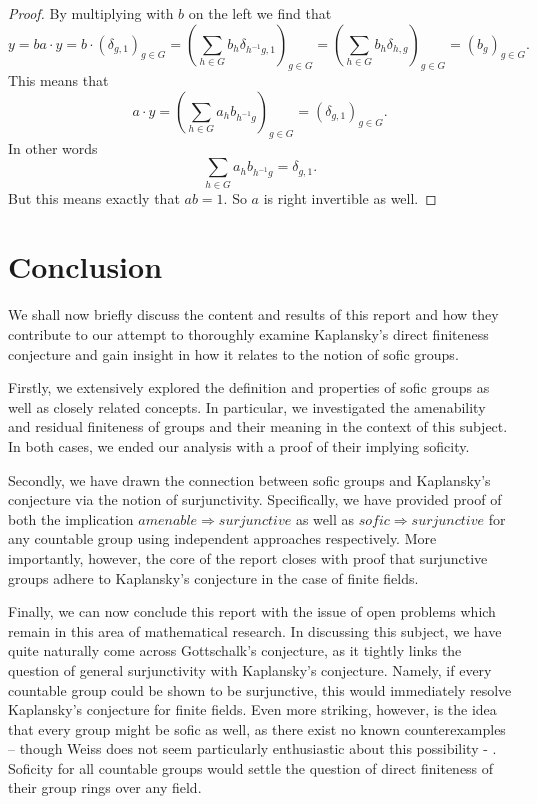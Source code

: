 \documentclass[titlepage, a4paper]{article}
\theoremstyle{theoremdd}
\theoremstyle{definitiondd}
\theoremstyle{remarkdd}
\begin{document}
\begin{proof}
		By multiplying with $b$ on the left we find that \[
			 y = ba\cdot y = b\cdot (\delta_{g, 1})_{g \in G} = \left( \sum_{h \in G} b_{h} \delta_{h^{-1}g, 1} \right)_{g \in G} = \left( \sum_{h \in G} b_{h} \delta_{h, g} \right)_{g \in G}
		 = \left( b_{g} \right) _{g \in G}.\] 
		This means that \[
		a\cdot y = \left( \sum_{h \in G} a_h b_{h^{-1}g} \right)_{g \in G} = \left( \delta_{g, 1} \right) _{g \in G} 
	.\] 
	In other words
	\[
	\sum_{h \in G} a_h b_{h^{-1}g} = \delta_{g, 1}
	.\]
	But this means exactly that $ab = 1$. So  $a$ is right invertible as well. 
	\end{proof}	
	
	\section{Conclusion}

We shall now briefly discuss the content and results of this report and how they contribute to our attempt to thoroughly examine Kaplansky’s direct finiteness conjecture and gain insight in how it relates to the notion of sofic groups.


Firstly, we extensively explored the definition and properties of sofic groups as well as closely related concepts. In particular, we investigated the amenability and residual finiteness of groups and their meaning in the context of this subject. In both cases, we ended our analysis with a proof of their implying soficity. 


Secondly, we have drawn the connection between sofic groups and Kaplansky’s conjecture via the notion of surjunctivity. Specifically, we have provided proof of both the implication $amenable \Rightarrow surjunctive$ as well as $sofic \Rightarrow surjunctive$ for any countable group using independent approaches respectively. More importantly, however, the core of the report closes with proof that surjunctive groups adhere to Kaplansky’s conjecture in the case of finite fields. 


Finally, we can now conclude this report with the issue of open problems which remain in this area of mathematical research. In discussing this subject, we have quite naturally come across Gottschalk’s conjecture, as it tightly links the question of general surjunctivity with Kaplansky’s conjecture. Namely, if every countable group could be shown to be surjunctive, this would immediately resolve Kaplansky’s conjecture for finite fields. Even more striking, however, is the idea that every group might be sofic as well, as there exist no known counterexamples – though Weiss does not seem particularly enthusiastic about this possibility \cite[introduction]{weiss_2000} -  . Soficity for all countable groups would settle the question of direct finiteness of their group rings over any field.
\end{document}
